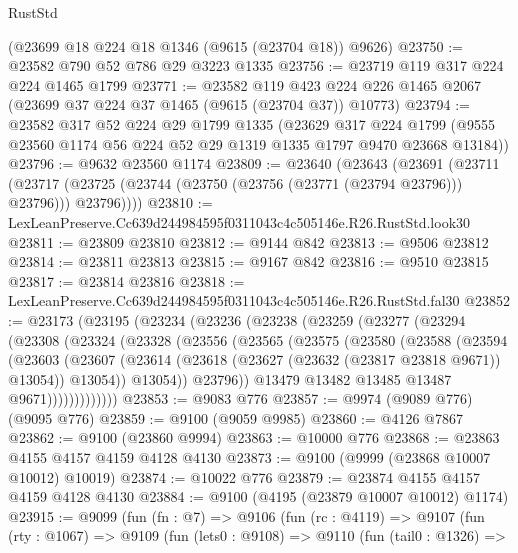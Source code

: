 \begin{lexlean}{RustStd}
\begin{coremodule}
    (@23699 @18 @224 @18 @1346 (@9615 (@23704 @18)) @9626)
@23750 := @23582 @790 @52 @786 @29 @3223 @1335
@23756 := @23719 @119 @317 @224 @224 @1465 @1799
@23771 := @23582
    @119
    @423
    @224
    @226
    @1465
    @2067
    (@23699 @37 @224 @37 @1465 (@9615 (@23704 @37)) @10773)
@23794 := @23582
    @317
    @52
    @224
    @29
    @1799
    @1335
    (@23629
      @317
      @224
      @1799
      (@9555 @23560 @1174 @56 @224 @52 @29 @1319 @1335 @1797 @9470 @23668 @13184))
@23796 := @9632 @23560 @1174
@23809 := @23640
    (@23643
      (@23691
        (@23711
          (@23717 (@23725 (@23744 (@23750 (@23756 (@23771 (@23794 @23796))) @23796))) @23796))))
@23810 := LexLeanPreserve.Cc639d244984595f0311043c4c505146e.R26.RustStd.look30
@23811 := @23809 @23810
@23812 := @9144 @842
@23813 := @9506 @23812
@23814 := @23811 @23813
@23815 := @9167 @842
@23816 := @9510 @23815
@23817 := @23814 @23816
@23818 := LexLeanPreserve.Cc639d244984595f0311043c4c505146e.R26.RustStd.fal30
@23852 := @23173
    (@23195
      (@23234
        (@23236
          (@23238
            (@23259
              (@23277
                (@23294
                  (@23308
                    (@23324
                      (@23328
                        (@23556
                          (@23565
                            (@23575
                              (@23580
                                (@23588
                                  (@23594
                                    (@23603
                                      (@23607
                                        (@23614
                                          (@23618 (@23627 (@23632 (@23817 @23818 @9671)) @13054))
                                          @13054))
                                      @13054))
                                  @23796))
                              @13479
                              @13482
                              @13485
                              @13487
                              @9671)))))))))))))
@23853 := @9083 @776
@23857 := @9974 (@9089 @776) (@9095 @776)
@23859 := @9100 (@9059 @9985)
@23860 := @4126 @7867
@23862 := @9100 (@23860 @9994)
@23863 := @10000 @776
@23868 := @23863 @4155 @4157 @4159 @4128 @4130
@23873 := @9100 (@9999 (@23868 @10007 @10012) @10019)
@23874 := @10022 @776
@23879 := @23874 @4155 @4157 @4159 @4128 @4130
@23884 := @9100 (@4195 (@23879 @10007 @10012) @1174)
@23915 := @9099
    (fun (fn : @7) =>
    @9106
      (fun (rc : @4119) =>
      @9107
        (fun (rty : @1067) =>
        @9109
          (fun (lets0 : @9108) =>
          @9110
            (fun (tail0 : @1326) =>

\end{coremodule}
\end{lexlean}

